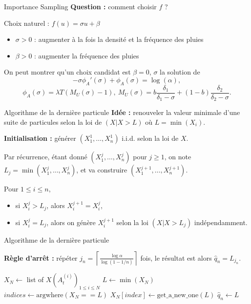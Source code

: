 \documentclass{beamer}
\begin{document}
\begin{frame}{Importance Sampling}
    \textbf{Question :} comment choisir $f$ ?

    \vspace{5pt}
    
    Choix naturel : $f(u)=\sigma u+\beta$
    \begin{itemize}
        \item $\sigma>0$ : augmenter à la fois la densité et la fréquence des pluies
        \item $\beta>0$ : augmenter la fréquence des pluies
    \end{itemize}
    On peut montrer qu'un choix candidat est $\beta=0$, $\sigma$ la solution de
    \[-\sigma \phi_A'(\sigma)+\phi_A(\sigma)=\log(\alpha),\]
\[\phi_A(\sigma)=\lambda T(M_U(\sigma)-1),\ M_U(\sigma)=b\frac{\delta_1}{\delta_1-\sigma}+(1-b)\frac{\delta_2}{\delta_2-\sigma}.\]
\end{frame}


\begin{frame}{Algorithme de la dernière particule}
    \textbf{Idée :} renouveler la valeur minimale d'une suite de particules selon la loi de $(X|X>L)$ où $L=\min(X_i)$. \pause

    \textbf{Initialisation :} générer $(X_1^1,\dots, X_n^1)$ i.i.d. selon la loi de $X$. 

    Par récurrence, étant donné $(X_1^j,\dots,X_n^j)$ pour $j\geq 1$, on note $L_j=\min(X_1^j,\dots,X_n^j)$, et va construire $(X_1^{j+1},\dots,X_n^{j+1})$.
    
    Pour $1\leq i\leq n$,
    \begin{itemize}
        \item si $X_i^j>L_j$, alors $X_i^{j+1}=X_i^j$,
        \item si $X_i^j=L_j$, alors on génère $X_i^{j+1}$ selon la loi $(X|X>L_j)$ indépendamment.
    \end{itemize}
    
\end{frame}

\begin{frame}{Algorithme de la dernière particule}

    \textbf{Règle d'arrêt :} répéter $\displaystyle j_n = \left\lceil\frac{\log \alpha}{\log(1-1/n)}\right\rceil$ fois, le résultat est alors $\hat q_{n}=L_{j_n}$.
    
    \begin{algorithm}[H]
\begin{algorithmic}[1]
\State $X_N \gets $ list of $X(A_t^{(i)})_{1\leq i\leq N}$
    \State $L \gets \min(X_N)$
    \State $indices \gets \text{argwhere}(X_N == L)$
        \State $X_N[index]\gets \text{get\_a\_new\_one}(L)$
    \EndWhile
\EndFor
\State $\hat q_n\gets L$
\end{algorithmic}
\caption{Algorithme pour obtenir $\hat q_n$}
\end{algorithm}

\end{frame}
\end{document}
